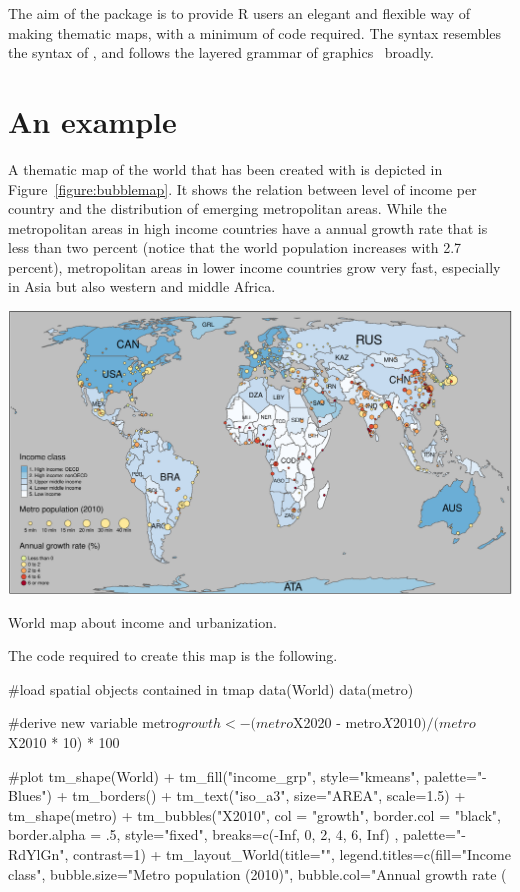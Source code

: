 The aim of the  package is to provide R users an elegant and flexible way of making thematic maps, with a minimum of code required. The syntax resembles the syntax of , and follows the layered grammar of graphics~\citep{wickham10} broadly.

\section{An example}

A thematic map of the world that has been created with  is depicted in Figure~\ref{figure:bubblemap}. It shows the relation between level of income per country and the distribution of emerging metropolitan areas. While the metropolitan areas in high income countries have a annual growth rate that is less than two percent (notice that the world population increases with 2.7 percent), metropolitan areas in lower income countries grow very fast, especially in Asia but also western and middle Africa.

\begin{widefigure}[htbp]
  \centering
  \includegraphics{bubbleMap2}
  \caption{World map about income and urbanization.}
  \label{figure:bubblemap}
\end{widefigure}

The code required to create this map is the following.

\begin{example}
#load spatial objects contained in tmap
data(World)
data(metro)

#derive new variable
metro$growth <- (metro$X2020 - metro$X2010) / (metro$X2010 * 10) * 100

#plot
tm_shape(World) +
  tm_fill("income_grp", style="kmeans", palette="-Blues") +
  tm_borders() +
  tm_text("iso_a3", size="AREA", scale=1.5) +
tm_shape(metro) +
  tm_bubbles("X2010", col = "growth", border.col = "black", 
    border.alpha = .5, style="fixed", breaks=c(-Inf, 0, 2, 4, 6, Inf) ,
    palette="-RdYlGn", contrast=1) + 
tm_layout_World(title="", legend.titles=c(fill="Income class", 
  bubble.size="Metro population (2010)", bubble.col="Annual growth rate (%
\end{example}

